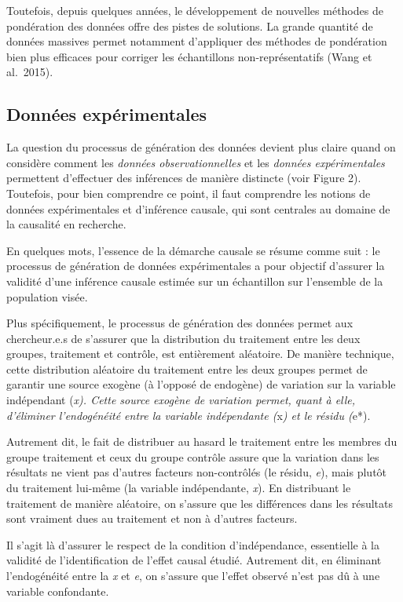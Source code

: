 \documentclass[
  letterpaper,
  DIV=11,
  numbers=noendperiod]{scrreprt}
\begin{document}
Toutefois, depuis quelques années, le développement de nouvelles
méthodes de pondération des données offre des pistes de solutions. La
grande quantité de données massives permet notamment d'appliquer des
méthodes de pondération bien plus efficaces pour corriger les
échantillons non-représentatifs (Wang et al.~2015).

\subsection*{Données expérimentales}\label{donnuxe9es-expuxe9rimentales}

La question du processus de génération des données devient plus claire
quand on considère comment les \emph{données observationnelles} et les
\emph{données expérimentales} permettent d'effectuer des inférences de
manière distincte (voir Figure 2). Toutefois, pour bien comprendre ce
point, il faut comprendre les notions de données expérimentales et
d'inférence causale, qui sont centrales au domaine de la causalité en
recherche.

En quelques mots, l'essence de la démarche causale se résume comme suit
: le processus de génération de données expérimentales a pour objectif
d'assurer la validité d'une inférence causale estimée sur un échantillon
sur l'ensemble de la population visée.

Plus spécifiquement, le processus de génération des données permet aux
chercheur.e.s de s'assurer que la distribution du traitement entre les
deux groupes, traitement et contrôle, est entièrement aléatoire. De
manière technique, cette distribution aléatoire du traitement entre les
deux groupes permet de garantir une source exogène (à l'opposé de
endogène) de variation sur la variable indépendant (\emph{x). Cette
source exogène de variation permet, quant à elle, d'éliminer
l'endogénéité entre la variable indépendante (}x\emph{) et le résidu
(}e*).

Autrement dit, le fait de distribuer au hasard le traitement entre les
membres du groupe traitement et ceux du groupe contrôle assure que la
variation dans les résultats ne vient pas d'autres facteurs
non-contrôlés (le résidu, \emph{e}), mais plutôt du traitement lui-même
(la variable indépendante, \emph{x}). En distribuant le traitement de
manière aléatoire, on s'assure que les différences dans les résultats
sont vraiment dues au traitement et non à d'autres facteurs.

Il s'agit là d'assurer le respect de la condition d'indépendance,
essentielle à la validité de l'identification de l'effet causal étudié.
Autrement dit, en éliminant l'endogénéité entre la \emph{x} et \emph{e},
on s'assure que l'effet observé n'est pas dû à une variable confondante.
\end{document}
